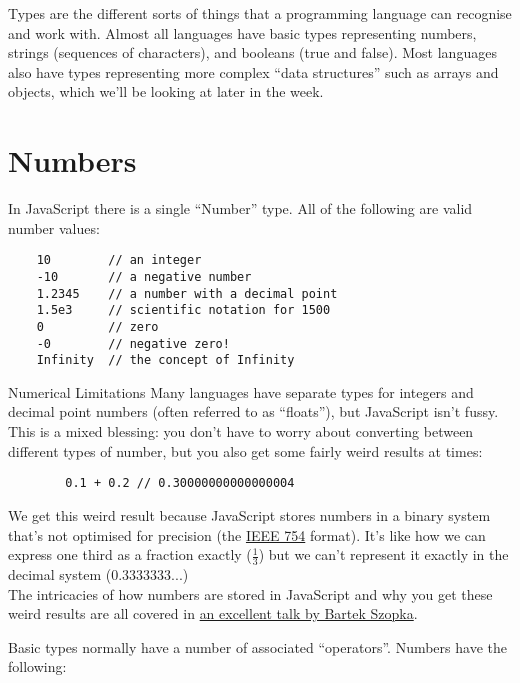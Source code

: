 Types are the different sorts of things that a programming language can recognise and work with. Almost all languages have basic types representing numbers, strings (sequences of characters), and booleans (true and false). Most languages also have types representing more complex ``data structures'' such as arrays and objects, which we'll be looking at later in the week.

\section{Numbers}

In JavaScript there is a single ``Number'' type. All of the following are valid number values:

\begin{verbatim}
    10        // an integer
    -10       // a negative number
    1.2345    // a number with a decimal point
    1.5e3     // scientific notation for 1500
    0         // zero
    -0        // negative zero!
    Infinity  // the concept of Infinity
\end{verbatim}

\pagebreak

\begin{infobox}{Numerical Limitations}
    Many languages have separate types for integers and decimal point numbers (often referred to as ``floats''), but JavaScript isn't fussy. This is a mixed blessing: you don't have to worry about converting between different types of number, but you also get some fairly weird results at times:

    \begin{verbatim}
        0.1 + 0.2 // 0.30000000000000004
    \end{verbatim}

    We get this weird result because JavaScript stores numbers in a binary system that's not optimised for precision (the \href{http://en.wikipedia.org/wiki/IEEE_floating_point}{IEEE 754} format). It's like how we can express one third as a fraction exactly ($\frac{1}{3}$) but we can't represent it exactly in the decimal system ($0.3333333...$)
    \\

    The intricacies of how numbers are stored in JavaScript and why you get these weird results are all covered in \href{https://www.youtube.com/watch?v=MqHDDtVYJRI}{an excellent talk by Bartek Szopka}.
\end{infobox}

Basic types normally have a number of associated ``operators''. Numbers have the following:
\\

